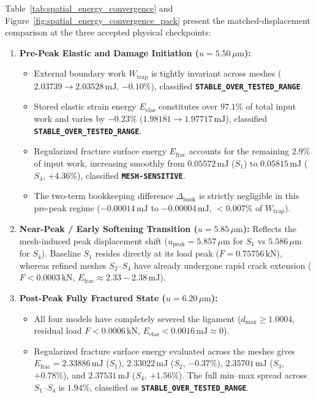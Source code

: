 Table~\ref{tab:spatial_energy_convergence} and Figure~\ref{fig:spatial_energy_convergence_pack} present the matched-displacement comparison at the three accepted physical checkpoints:
\begin{enumerate}[leftmargin=*]
  \item \textbf{Pre-Peak Elastic and Damage Initiation ($u = 5.50\,\mu\mathrm{m}$):}
    \begin{itemize}
      \item External boundary work $W_{\mathrm{trap}}$ is tightly invariant across meshes ($2.03739 \to 2.03528\,\mathrm{mJ}$, $-0.10\%$), classified \textbf{\texttt{STABLE\_OVER\_TESTED\_RANGE}}.
      \item Stored elastic strain energy $E_{\mathrm{elas}}$ constitutes over $97.1\%$ of total input work and varies by $-0.23\%$ ($1.98181 \to 1.97717\,\mathrm{mJ}$), classified \textbf{\texttt{STABLE\_OVER\_TESTED\_RANGE}}.
      \item Regularized fracture surface energy $E_{\mathrm{frac}}$ accounts for the remaining $2.9\%$ of input work, increasing smoothly from $0.05572\,\mathrm{mJ}$ ($S_1$) to $0.05815\,\mathrm{mJ}$ ($S_4$, $+4.36\%$), classified \textbf{\texttt{MESH-SENSITIVE}}.
      \item The two-term bookkeeping difference $\Delta_{\mathrm{book}}$ is strictly negligible in this pre-peak regime ($-0.00014\,\mathrm{mJ}$ to $-0.00004\,\mathrm{mJ}$, $< 0.007\%$ of $W_{\mathrm{trap}}$).
    \end{itemize}
  \item \textbf{Near-Peak / Early Softening Transition ($u = 5.85\,\mu\mathrm{m}$):}
    Reflects the mesh-induced peak displacement shift ($u_{\mathrm{peak}} = 5.857\,\mu\mathrm{m}$ for $S_1$ vs $5.586\,\mu\mathrm{m}$ for $S_4$). Baseline $S_1$ resides directly at its load peak ($F = 0.75756\,\mathrm{kN}$), whereas refined meshes $S_2$--$S_4$ have already undergone rapid crack extension ($F < 0.0003\,\mathrm{kN}$, $E_{\mathrm{frac}} \approx 2.33 - 2.38\,\mathrm{mJ}$).
  \item \textbf{Post-Peak Fully Fractured State ($u = 6.20\,\mu\mathrm{m}$):}
    \begin{itemize}
      \item All four models have completely severed the ligament ($d_{\max} \ge 1.0004$, residual load $F < 0.0006\,\mathrm{kN}$, $E_{\mathrm{elas}} < 0.0016\,\mathrm{mJ} \approx 0$).
      \item Regularized fracture surface energy evaluated across the meshes gives $E_{\mathrm{frac}} = 2.33886\,\mathrm{mJ}$ ($S_1$), $2.33022\,\mathrm{mJ}$ ($S_2$, $-0.37\%$), $2.35701\,\mathrm{mJ}$ ($S_3$, $+0.78\%$), and $2.37531\,\mathrm{mJ}$ ($S_4$, $+1.56\%$). The full min--max spread across $S_1$--$S_4$ is \textbf{$1.94\%$}, classified as \textbf{\texttt{STABLE\_OVER\_TESTED\_RANGE}}.

\end{itemize}
\end{enumerate}
